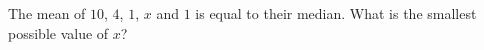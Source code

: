 The mean of $10$, $4$, $1$, $x$ and $1$ is equal to their median. What is the smallest possible value of $x$?
